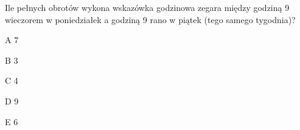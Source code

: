 \begin{tresc}
Ile pełnych obrotów wykona wskazówka godzinowa zegara między godziną 9 wieczorem w poniedziałek a godziną 9 rano w piątek (tego samego tygodnia)?
\end{tresc}
\begin{wariant}{A} 7 \end{wariant}
\begin{wariant}{B} 3 \end{wariant}
\begin{wariant}{C} 4 \end{wariant}
\begin{wariant}{D} 9 \end{wariant}
\begin{wariant}{E} 6 \end{wariant}
